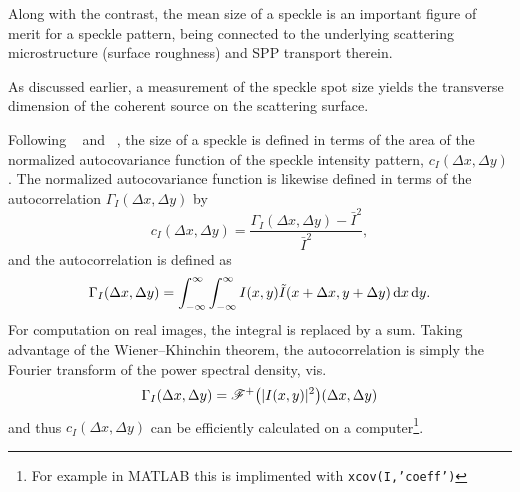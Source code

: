 Along with the contrast, the mean size of a speckle is an important figure of
merit for a speckle pattern, being connected to the underlying scattering
microstructure (surface roughness) and SPP transport therein.

As discussed earlier, a measurement of the speckle spot
size yields the transverse dimension of the coherent source
on the scattering surface.


Following ~\cite{goodman1975statistical} and
~\cite{dainty1975laser}, the size of a speckle is defined in
terms of the area of the normalized autocovariance function of the speckle
intensity pattern, $c_I(\Delta x, \Delta y)$.  The normalized autocovariance
function is likewise defined in terms of the autocorrelation $\Gamma_I(\Delta
x, \Delta y)$ by 
\begin{equation}
c_I(\Delta x, \Delta y) = \frac{\Gamma_I(\Delta x, \Delta y) - \bar{I}^2}{\bar{I}^2},
\end{equation}
and the autocorrelation is defined as
\begin{equation}
\Gamma_I(\Delta x, \Delta y) = \int_{-\infty}^{\infty}\int_{-\infty}^{\infty} I(x,y) \tilde{I}(x+\Delta x,y+\Delta y) \,\mathrm{d} x \,\mathrm{d} y.
\end{equation}
For computation on real images, the integral is replaced by a sum.  Taking
advantage of the Wiener–Khinchin theorem, the autocorrelation is simply the
Fourier transform of the power spectral density, vis.
\begin{equation}
\Gamma_I(\Delta x, \Delta y) = {\mathscr{F}^{+}\bigl(|I(x,y)|^2\bigr)}(\Delta x, \Delta y)
\end{equation}
and thus  $c_I(\Delta x, \Delta y)$ can be efficiently calculated on a
computer\footnote{For example in MATLAB this is implimented with
\texttt{xcov(I,'coeff')}}.

